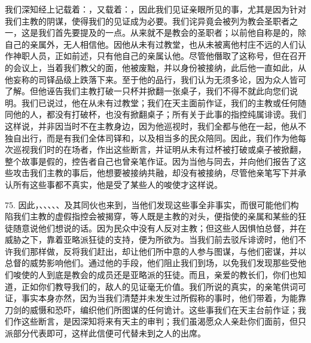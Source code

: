 我们深知经上记载着：，又载着：，因此我们见证亲眼所见的事，尤其是因为针对我们主教的阴谋，使得我们的见证成为必要。我们诧异竟会被列为教会圣职者之一，这是我们首先要提及的一点。从来就不是教会的圣职者；以前他自称是的，除自己的亲属外，无人相信他。因他从未有过教堂，也从未被离他村庄不远的人们认作神职人员，正如前述，只有他自己的亲属认他。尽管他僭取了这称号，但在召开的会议上，当着我们教父的面，他被废黜，并以身份被接纳，此后他一直如此，从他妄称的司铎品级上跌落下来。至于他的品行，我们认为无须多论，因为众人皆可了解。但他诬告我们主教打破一只杯并掀翻一张桌子，我们不得不就此向您们说明。我们已说过，他在从未有过教堂；我们在天主面前作证，我们的主教或任何随同他的人，都没有打破杯，也没有掀翻桌子；所有关于此事的指控纯属诽谤。我们这样说，并非因当时不在主教身边，因为他巡视时，我们全都与他在一起，他从不独自出行，而是有我们全体司铎和，以及相当多的民众陪同。因此，我们作为他每次巡视我们时的在场者，作出这些断言，并证明从未有过杯被打破或桌子被掀翻，整个故事是假的，控告者自己也曾亲笔作证。因为当他与同去，并向他们报告了这些攻击我们主教的事后，他想要被接纳共融，却没有被接纳，尽管他亲笔写下并承认所有这些事都不真实，他是受了某些人的唆使才这样说。\par

75. 因此，、、、、、及其同伙也来到，当他们发现这些事全非事实，而很可能他们构陷我们主教的虚假指控会被揭穿，等人既是主教的对头，便指使的亲属和某些的狂徒随意说他们想说的话。因为民众中没有人反对主教；但这些人因惧怕总督，并在威胁之下，靠着亚略派狂徒的支持，便为所欲为。当我们前去驳斥诽谤时，他们不许我们那样做，反将我们赶出，却让他们所中意的人参与图谋，与他们密谋，并以总督的威势影响他们。通过他的手段，他们阻止我们到场，以免我们发现那些受他们唆使的人到底是教会的成员还是亚略派的狂徒。而且，亲爱的教长们，你们也知道，正如你们教导我们的，敌人的见证毫无价值。我们所说的真实，的亲笔供词可证，事实本身亦然，因为当我们清楚并未发生过所假称的事时，他们带着，为能靠刀剑的威慑和恐吓，编织他们所图谋的任何诡计。这些事我们在天主台前作证；我们作这些断言，是因深知将来有天主的审判；我们虽渴愿众人亲赴你们面前，但只派部分代表即可，这样此信便可代替未到之人的出席。\par

